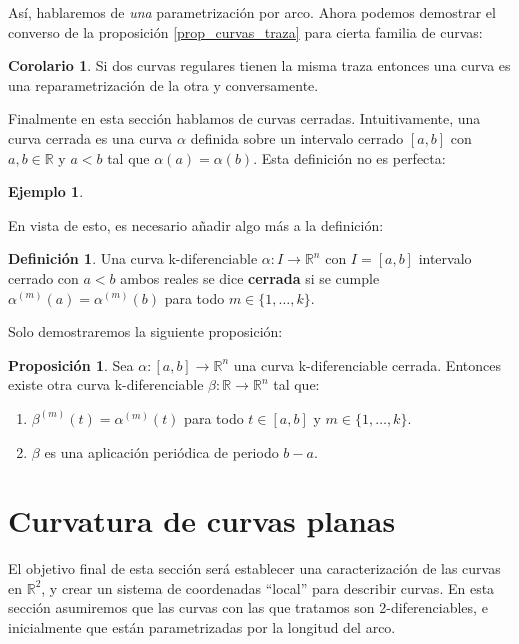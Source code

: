 \documentclass{article}
\theoremstyle{definition}
\newtheorem{prop}{Proposición}
\newtheorem{cor}{Corolario}
\newtheorem{define}{Definición}
\newtheorem{ejem}{Ejemplo}
\newcommand{\reales}{\mathbb{R}}
\begin{document}
Así, hablaremos de \textit{una} parametrización por arco. Ahora podemos demostrar el converso de la proposición \eqref{prop_curvas_traza} para cierta familia de curvas:

\begin{cor}
	Si dos curvas regulares tienen la misma traza entonces una curva es una reparametrización de la otra y conversamente.
\end{cor}

Finalmente en esta sección hablamos de curvas cerradas. Intuitivamente, una curva cerrada es una curva $\alpha$ definida sobre un intervalo cerrado $[a, b]$ con $a,b \in \reales$ y $a < b$ tal que $\alpha(a) = \alpha(b)$. Esta definición no es perfecta:

\begin{ejem}
	
\end{ejem}

En vista de esto, es necesario añadir algo más a la definición:

\begin{define}
	Una curva k-diferenciable $\alpha: I \rightarrow \reales^{n}$ con $I = [a, b]$ intervalo cerrado con $a < b$ ambos reales se dice \textbf{cerrada} si se cumple $\alpha^{(m)}(a) = \alpha^{(m)}(b)$ para todo $m \in \{1, \dots, k\}$.
\end{define}

Solo demostraremos la siguiente proposición:

\begin{prop}
	Sea $\alpha: [a, b] \rightarrow \reales^{n}$ una curva k-diferenciable cerrada. Entonces existe otra curva k-diferenciable $\beta: \reales \rightarrow \reales^{n}$ tal que:
	\begin{enumerate}
		\item
		$\beta^{(m)}(t) = \alpha^{(m)}(t)$ para todo $t \in [a, b]$ y $m \in \{1, \dots, k\}$.
		\item
		$\beta$ es una aplicación periódica de periodo $b-a$.
	\end{enumerate}
\end{prop}













\section{Curvatura de curvas planas}
El objetivo final de esta sección será establecer una caracterización de las curvas en $\reales^{2}$, y crear un sistema de coordenadas ``local'' para describir curvas. En esta sección asumiremos que las curvas con las que tratamos son 2-diferenciables, e inicialmente que están parametrizadas por la longitud del arco.\\ 
\end{document}
